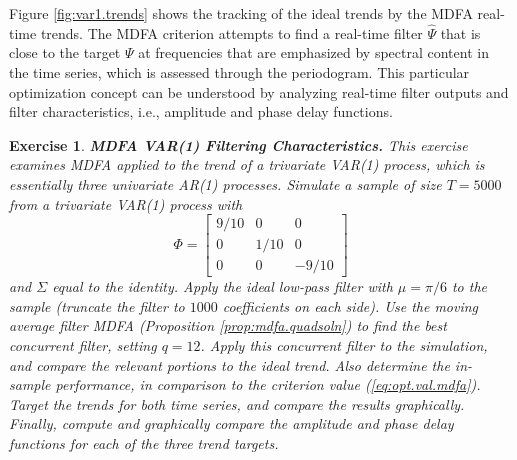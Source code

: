 \documentclass[a4paper]{book}
\newtheorem{Exercise}{Exercise}
\begin{document}
 Figure \ref{fig:var1.trends} shows the tracking of the ideal trends
 by the MDFA real-time trends.
The MDFA criterion  attempts to find a real-time filter $\widehat{\Psi}$
 that is close to the target $\Psi$ at frequencies that are emphasized
 by spectral content in the time series, which is assessed
 through the periodogram.   This particular 
optimization concept can be understood 
  by analyzing real-time filter outputs and filter 
  characteristics, i.e., amplitude and phase delay functions.


\begin{Exercise} {\bf MDFA VAR(1) Filtering Characteristics.} \rm
\label{exer:var1mdfa2.filter}
 This exercise examines MDFA applied to the trend of a trivariate VAR(1) process,
 which is essentially three univariate AR(1) processes.
Simulate a sample of size $T=5000$ from a
 trivariate VAR(1) process with 
\[
  \Phi = \left[ \begin{array}{ccc} 9/10 & 0 & 0 \\  0 & 1/10 & 0  \\ 0 & 0 & -9/10
   \end{array} \right]
\]
 and $\Sigma$ equal to the identity.   
  Apply the   ideal low-pass filter  with 
  $\mu = \pi/6$ to the sample (truncate the filter to $1000$ coefficients on each side).  
 Use the moving average filter
 MDFA  (Proposition \ref{prop:mdfa.quadsoln}) to find the best
 concurrent filter, setting $q= 12$.  Apply this concurrent filter 
 to the simulation, and compare the relevant portions to the ideal trend.
Also determine the in-sample performance, in comparison to the criterion value
 (\ref{eq:opt.val.mdfa}).
  Target the trends for both time series, and compare the results graphically.
 Finally, compute and graphically compare  the amplitude and phase delay
   functions for each of the three trend targets.
\end{Exercise}
\end{document}
